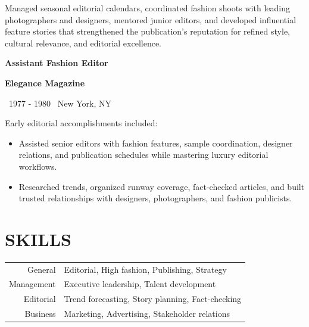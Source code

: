 \documentclass[11pt, a4paper]{article}
\newcommand{\resumeentry}[4]{

  \par\vspace{0.5em}
  {\color{enhancvgray}\bfseries\Large{#1}}\par
  {\color{enhancvblue}\bfseries{#2}}\par
  {\footnotesize
  {\color{lightgray}\faCalendar}\ {\color{mediumgray}#3} \qquad {\color{lightgray}\faMapMarker}\ {\color{mediumgray}#4}\par
}
  \vspace{0.2em}

}
\begin{document}
\begin{paracol}{2}
Managed seasonal editorial calendars, coordinated fashion shoots with leading photographers and designers, mentored junior editors, and developed influential feature stories that strengthened the publication's reputation for refined style, cultural relevance, and editorial excellence.\par



\resumeentry{Assistant Fashion Editor}{Elegance Magazine}{1977 - 1980}{New York, NY}

Early editorial accomplishments included:


\begin{itemize}[leftmargin=*, noitemsep, topsep=0pt]

    \item Assisted senior editors with fashion features, sample coordination, designer relations, and publication schedules while mastering luxury editorial workflows.\par

    \item Researched trends, organized runway coverage, fact-checked articles, and built trusted relationships with designers, photographers, and fashion publicists.\par

\end{itemize}






\switchcolumn



\raggedright


\section{SKILLS}



{\renewcommand{\arraystretch}{1.3}
\begin{tabularx}{\linewidth}{>{\raggedleft\arraybackslash}R Y}

General & Editorial, High fashion, Publishing, Strategy\\

Management & Executive leadership, Talent development\\

Editorial & Trend forecasting, Story planning, Fact-checking\\

Business & Marketing, Advertising, Stakeholder relations\\


\end{tabularx}}
\end{paracol}
\end{document}
